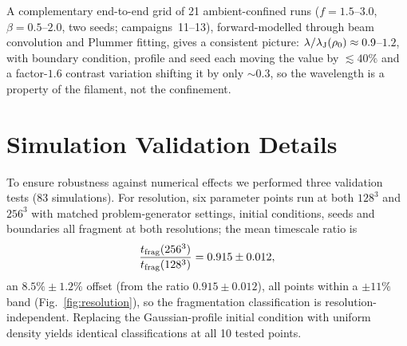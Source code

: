 \documentclass[usenatbib,twoside,twocolumn]{mnras}
\begin{document}
A complementary end-to-end grid of 21 ambient-confined runs ($f=1.5$--$3.0$, $\beta=0.5$--$2.0$, two seeds; campaigns~11--13), forward-modelled through beam convolution and Plummer fitting, gives a consistent picture: $\lambda/\lambda_{\rm J}(\rho_0)\approx0.9$--$1.2$, with boundary condition, profile and seed each moving the value by $\lesssim40\%$ and a factor-$1.6$ contrast variation shifting it by only $\sim0.3$, so the wavelength is a property of the filament, not the confinement.

\section{Simulation Validation Details}
\label{sec:validation}

To ensure robustness against numerical effects we performed three validation tests (83 simulations). For resolution, six parameter points run at both $128^3$ and $256^3$ with matched problem-generator settings, initial conditions, seeds and boundaries all fragment at both resolutions; the mean timescale ratio is
\begin{equation}
\frac{t_{\rm frag}(256^3)}{t_{\rm frag}(128^3)} = 0.915 \pm 0.012,
\end{equation}
an $8.5\%\pm1.2\%$ offset (from the ratio $0.915\pm0.012$), all points within a $\pm11\%$ band (Fig.~\ref{fig:resolution}), so the fragmentation classification is resolution-independent. Replacing the Gaussian-profile initial condition with uniform density yields identical classifications at all 10 tested points.
\end{document}
